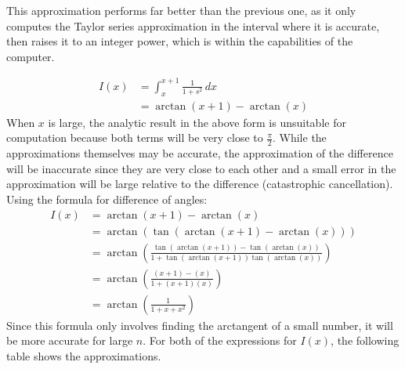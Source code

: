 \documentclass{article}
\begin{document}
This approximation performs far better than the previous one, as it only computes the Taylor series approximation in the interval where it is accurate, then raises it to an integer power, which is within the capabilities of the computer.

\clearpage

\problem{}
\begin{align*}
    I(x) & = \int_x^{x+1} \frac{1}{1 + s^2} \, dx \\
    & = \arctan(x + 1) - \arctan(x)
\end{align*}
When $x$ is large, the analytic result in the above form is unsuitable for computation because both terms will be very close to $\frac{\pi}{2}$. While the approximations themselves may be accurate, the approximation of the difference will be inaccurate since they are very close to each other and a small error in the approximation will be large relative to the difference (catastrophic cancellation).
Using the formula for difference of angles:
\begin{align*}
    I(x) & = \arctan(x + 1) - \arctan(x) \\
    & = \arctan(\tan(\arctan(x + 1) - \arctan(x))) \\
    & = \arctan\left(\frac{\tan(\arctan(x+1)) - \tan(\arctan(x))}{1 + \tan(\arctan(x+1))\tan(\arctan(x))}\right) \\
    & = \arctan\left(\frac{(x+1) - (x)}{1 + (x+1)(x)}\right) \\
    & = \arctan\left(\frac{1}{1 + x + x^2}\right)
\end{align*}
Since this formula only involves finding the arctangent of a small number, it will be more accurate for large $n$.
For both of the expressions for $I(x)$, the following table shows the approximations.
\end{document}
